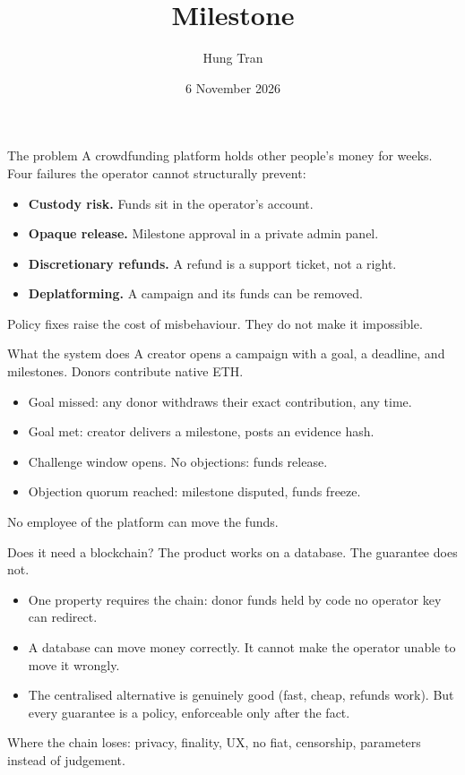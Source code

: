 \documentclass[aspectratio=169,10pt]{beamer}
\title{Milestone}
\author{Hung Tran}
\institute{Vietnamese-German University}
\date{6 November 2026}
\begin{document}
\begin{frame}{The problem}
A crowdfunding platform holds other people's money for weeks.
Four failures the operator cannot structurally prevent:
\begin{itemize}
  \item \textbf{Custody risk.} Funds sit in the operator's account.
  \item \textbf{Opaque release.} Milestone approval in a private admin panel.
  \item \textbf{Discretionary refunds.} A refund is a support ticket, not a right.
  \item \textbf{Deplatforming.} A campaign and its funds can be removed.
\end{itemize}
Policy fixes raise the cost of misbehaviour. They do not make it impossible.
\end{frame}

\begin{frame}{What the system does}
A creator opens a campaign with a goal, a deadline, and milestones.
Donors contribute native ETH.
\begin{itemize}
  \item Goal missed: any donor withdraws their exact contribution, any time.
  \item Goal met: creator delivers a milestone, posts an evidence hash.
  \item Challenge window opens. No objections: funds release.
  \item Objection quorum reached: milestone disputed, funds freeze.
\end{itemize}
No employee of the platform can move the funds.
\end{frame}

\begin{frame}{Does it need a blockchain?}
The product works on a database. The guarantee does not.
\begin{itemize}
  \item One property requires the chain: donor funds held by code no operator key can redirect.
  \item A database can move money correctly. It cannot make the operator unable to move it wrongly.
  \item The centralised alternative is genuinely good (fast, cheap, refunds work). But every guarantee is a policy, enforceable only after the fact.
\end{itemize}
Where the chain loses: privacy, finality, UX, no fiat, censorship, parameters instead of judgement.
\end{frame}
\end{document}
